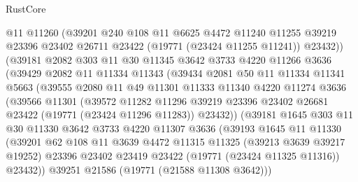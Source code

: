 \begin{lexlean}{RustCore}
\begin{coremodule}
              @11
              @11260
              (@39201
                @240
                @108
                @11
                @6625
                @4472
                @11240
                @11255
                @39219
                @23396
                @23402
                @26711
                @23422
                (@19771 (@23424 @11255 @11241))
                @23432))
            (@39181
              @2082
              @303
              @11
              @30
              @11345
              @3642
              @3733
              @4220
              @11266
              @3636
              (@39429
                @2082
                @11
                @11334
                @11343
                (@39434
                  @2081
                  @50
                  @11
                  @11334
                  @11341
                  @5663
                  (@39555
                    @2080
                    @11
                    @49
                    @11301
                    @11333
                    @11340
                    @4220
                    @11274
                    @3636
                    (@39566
                      @11301
                      (@39572
                        @11282
                        @11296
                        @39219
                        @23396
                        @23402
                        @26681
                        @23422
                        (@19771 (@23424 @11296 @11283))
                        @23432))
                    (@39181
                      @1645
                      @303
                      @11
                      @30
                      @11330
                      @3642
                      @3733
                      @4220
                      @11307
                      @3636
                      (@39193
                        @1645
                        @11
                        @11330
                        (@39201
                          @62
                          @108
                          @11
                          @3639
                          @4472
                          @11315
                          @11325
                          (@39213 @3639 @39217 @19252)
                          @23396
                          @23402
                          @23419
                          @23422
                          (@19771 (@23424 @11325 @11316))
                          @23432))
                      @39251
                      @21586
                      (@19771 (@21588 @11308 @3642)))

\end{coremodule}
\end{lexlean}
